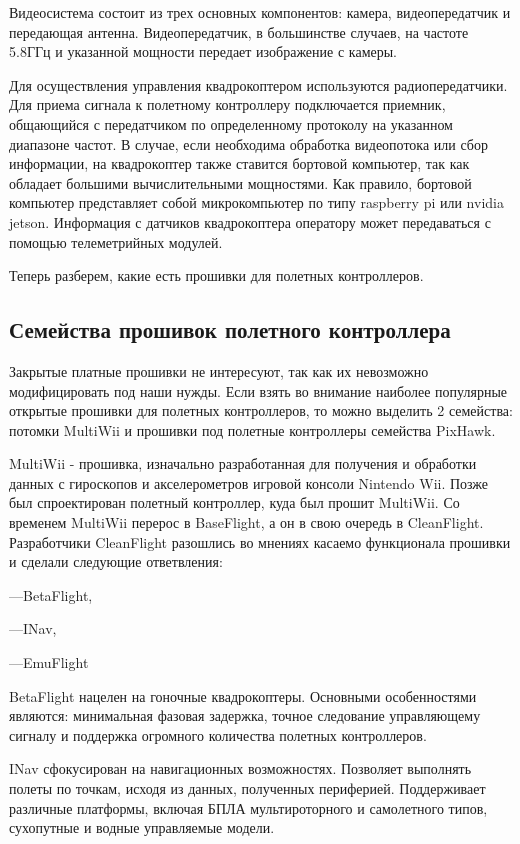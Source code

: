 Видеосистема состоит из трех основных компонентов: камера, видеопередатчик и передающая антенна. Видеопередатчик, в большинстве случаев, на частоте 5.8ГГц и указанной мощности передает изображение с камеры.

Для осуществления управления квадрокоптером используются радиопередатчики. Для приема сигнала к полетному контроллеру подключается приемник, общающийся с передатчиком по определенному протоколу на указанном диапазоне частот. В случае, если необходима обработка видеопотока или сбор информации, на квадрокоптер также ставится бортовой компьютер, так как обладает большими вычислительными мощностями. Как правило, бортовой компьютер представляет собой микрокомпьютер по типу raspberry pi или nvidia jetson. Информация с датчиков квадрокоптера оператору может передаваться с помощью телеметрийных модулей.

Теперь разберем, какие есть прошивки для полетных контроллеров.

\subsection{Семейства прошивок полетного контроллера}
Закрытые платные прошивки не интересуют, так как их невозможно модифицировать под наши нужды. Если взять во внимание наиболее популярные открытые прошивки для полетных контроллеров, то можно выделить 2 семейства: потомки MultiWii и прошивки под полетные контроллеры семейства PixHawk.

MultiWii - прошивка, изначально разработанная для получения и обработки данных с гироскопов и акселерометров игровой консоли Nintendo Wii. Позже был спроектирован полетный контроллер, куда был прошит MultiWii. Со временем MultiWii перерос в BaseFlight, а он в свою очередь в CleanFlight. Разработчики CleanFlight разошлись во мнениях касаемо функционала прошивки и сделали следующие ответвления:

---BetaFlight,

---INav,

---EmuFlight

BetaFlight нацелен на гоночные квадрокоптеры. Основными особенностями являются: минимальная фазовая задержка, точное следование управляющему сигналу и поддержка огромного количества полетных контроллеров.

INav сфокусирован на навигационных возможностях. Позволяет выполнять полеты по точкам, исходя из данных, полученных периферией. Поддерживает различные платформы, включая БПЛА мультироторного и самолетного типов, сухопутные и водные управляемые модели.

